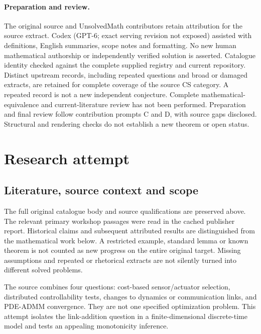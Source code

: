 \documentclass[11pt]{article}
\begin{document}
\paragraph{Preparation and review.}
The original source and UnsolvedMath contributors retain attribution for the source extract. Codex (GPT-6; exact serving revision not exposed) assisted with definitions, English summaries, scope notes and formatting. No new human mathematical authorship or independently verified solution is asserted. Catalogue identity checked against the complete supplied registry and current repository. Distinct upstream records, including repeated questions and broad or damaged extracts, are retained for complete coverage of the source CS category. A repeated record is not a new independent conjecture. Complete mathematical-equivalence and current-literature review has not been performed. Preparation and final review follow contribution prompts C and D, with source gaps disclosed. Structural and rendering checks do not establish a new theorem or open status.
\label{end:statement}

\section{Research attempt}
\subsection{Literature, source context and scope}
The full original catalogue body and source qualifications are preserved above. The relevant primary workshop passages were read in the cached publisher report. Historical claims and subsequent attributed results are distinguished from the mathematical work below. A restricted example, standard lemma or known theorem is not counted as new progress on the entire original target. Missing assumptions and repeated or rhetorical extracts are not silently turned into different solved problems.

The source combines four questions: cost-based sensor/actuator selection, distributed controllability tests, changes to dynamics or communication links, and PDE-ADMM convergence. They are not one specified optimization problem. This attempt isolates the link-addition question in a finite-dimensional discrete-time model and tests an appealing monotonicity inference.
\end{document}
